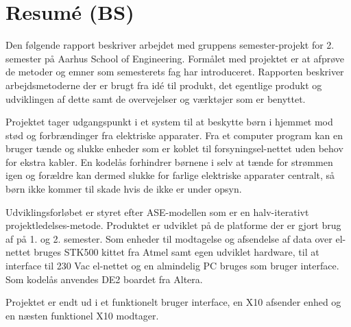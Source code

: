 \chapter*{Resumé (BS)}

Den følgende rapport beskriver arbejdet med gruppens semester-projekt for 2. semester på Aarhus School of Engineering. Formålet med projektet er at afprøve de metoder og emner som semesterets fag har introduceret. Rapporten beskriver arbejdsmetoderne der er brugt fra idé til produkt, det egentlige produkt og udviklingen af dette samt de overvejelser og værktøjer som er benyttet.

Projektet tager udgangspunkt i et system til at beskytte børn i hjemmet mod stød og forbrændinger fra elektriske apparater. Fra et computer program kan en bruger tænde og slukke enheder som er koblet til forsyningsel-nettet uden behov for ekstra kabler. En kodelås forhindrer børnene i selv at tænde for strømmen igen og forældre kan dermed slukke for farlige elektriske apparater centralt, så børn ikke kommer til skade hvis de ikke er under opsyn. 

Udviklingsforløbet er styret efter ASE-modellen som er en halv-iterativt projektledelses-metode. Produktet er udviklet på de platforme der er gjort brug af på 1. og 2. semester. Som enheder til modtagelse og afsendelse af data over el-nettet bruges STK500 kittet fra Atmel samt egen udviklet hardware, til at interface til 230 Vac el-nettet og en almindelig PC bruges som bruger interface. Som kodelås anvendes DE2 boardet fra Altera.

Projektet er endt ud i et funktionelt bruger interface, en X10 afsender enhed og en næsten funktionel X10 modtager.